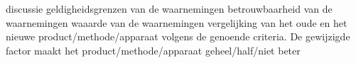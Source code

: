 
discussie
geldigheidsgrenzen van de waarnemingen
betrouwbaarheid van de waarnemingen
waaarde van de waarnemingen
vergelijking van het oude en het nieuwe product/methode/apparaat volgens de genoende criteria. De gewijzigde factor maakt het product/methode/apparaat geheel/half/niet beter




